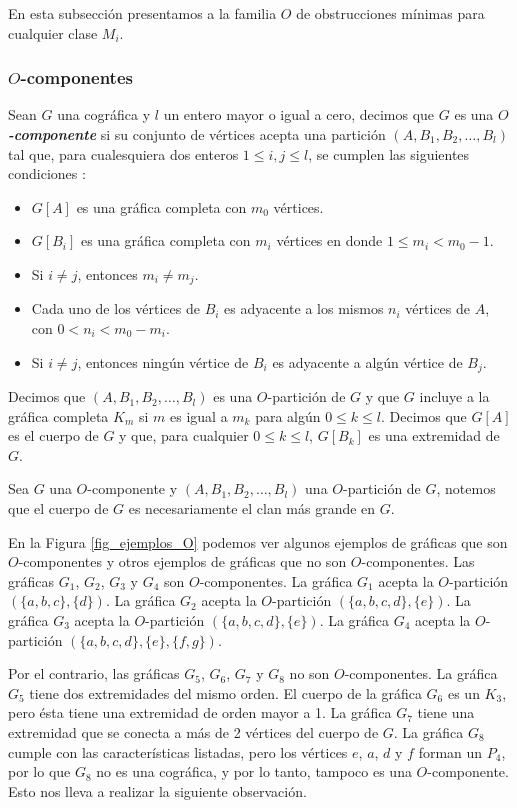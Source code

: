 En esta subsección presentamos a la familia $O$ de obstrucciones mínimas para cualquier clase $M_i$.

\subsubsection{$O$-componentes}

Sean $G$ una cográfica y $l$ un entero mayor o igual a cero, decimos que $G$ es una \textbf{\emph{$O$-componente}} si su conjunto de vértices acepta una partición $(A,B_1,B_2,\dots,B_l)$ tal que, para cualesquiera dos enteros $1\le i,j \le l$, se cumplen las siguientes condiciones :

\begin{itemize}
    \item $G[A]$ es una gráfica completa con $m_0$ vértices.
    \item $G[B_i]$ es una gráfica completa con $m_i$ vértices en donde $1\le m_i<m_0-1$.
    \item Si $i\neq j$, entonces $m_i\neq m_j$.
    \item Cada uno de los vértices de $B_i$ es adyacente a los mismos $n_i$ vértices de $A$, con $0<n_i<m_0-m_i$.
    \item Si $i\neq j$, entonces ningún vértice de $B_i$ es adyacente a algún vértice de $B_j$.
\end{itemize}

Decimos que $(A,B_1,B_2,\dots,B_l)$ es una $O$-partición de $G$ y que $G$ incluye a la gráfica completa $K_m$ si $m$ es igual a $m_k$ para algún $0\le k\le l$. Decimos que $G[A]$ es el cuerpo de $G$ y que, para cualquier $0\le k\le l$, $G[B_k]$ es una extremidad de $G$.

Sea $G$ una $O$-componente y $(A,B_1,B_2,\dots,B_l)$ una $O$-partición de $G$, notemos que el cuerpo de $G$ es necesariamente el clan más grande en $G$.

En la Figura \ref{fig_ejemplos_O} podemos ver algunos ejemplos de gráficas que son $O$-componentes y otros ejemplos de gráficas que no son $O$-componentes. Las gráficas $G_1$, $G_2$, $G_3$ y $G_4$ son $O$-componentes. La gráfica $G_1$ acepta la $O$-partición $(\{a,b,c\},\{d\})$. La gráfica $G_2$ acepta la $O$-partición $(\{a,b,c,d\},\{e\})$. La gráfica $G_3$ acepta la $O$-partición $(\{a,b,c,d\},\{e\})$. La gráfica $G_4$ acepta la $O$-partición $(\{a,b,c,d\},\{e\},\{f,g\})$. 

Por el contrario, las gráficas $G_5$, $G_6$, $G_7$ y $G_8$ no son $O$-componentes. La gráfica $G_5$ tiene dos extremidades del mismo orden. El cuerpo de la gráfica $G_6$ es un $K_3$, pero ésta tiene una extremidad de orden mayor a  1. La gráfica $G_7$ tiene una extremidad que se conecta a más de 2 vértices del cuerpo de $G$. La gráfica $G_8$ cumple con las características listadas, pero los vértices $e$, $a$, $d$ y $f$ forman un $P_4$, por lo que $G_8$ no es una cográfica, y por lo tanto, tampoco es una $O$-componente. Esto nos lleva a realizar la siguiente observación.

